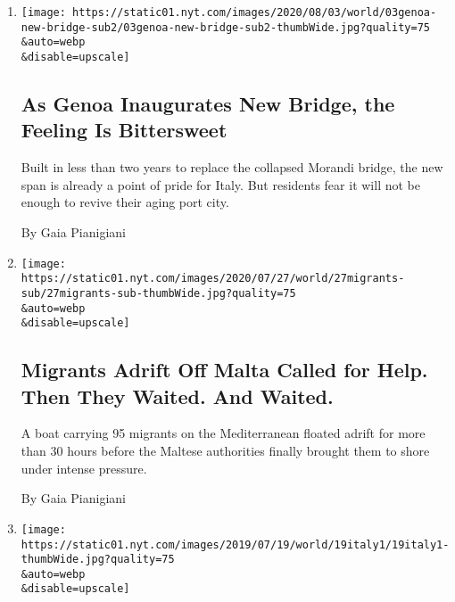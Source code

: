 \begin{enumerate}
\def\labelenumi{\arabic{enumi}.}
\item
  \href{/2020/08/02/world/europe/genoa-Morandi-bridge-replacement.html}{}

  \texttt{[image: https://static01.nyt.com/images/2020/08/03/world/03genoa-new-bridge-sub2/03genoa-new-bridge-sub2-thumbWide.jpg?quality=75\\\&auto=webp\\\&disable=upscale]}

  \hypertarget{as-genoa-inaugurates-new-bridge-the-feeling-is-bittersweet}{%
  \subsection{As Genoa Inaugurates New Bridge, the Feeling Is
  Bittersweet}\label{as-genoa-inaugurates-new-bridge-the-feeling-is-bittersweet}}

  Built in less than two years to replace the collapsed Morandi bridge,
  the new span is already a point of pride for Italy. But residents fear
  it will not be enough to revive their aging port city.

  By Gaia Pianigiani
\item
  \href{/2020/07/27/world/europe/migrant-boat-malta-stranded.html}{}

  \texttt{[image: https://static01.nyt.com/images/2020/07/27/world/27migrants-sub/27migrants-sub-thumbWide.jpg?quality=75\\\&auto=webp\\\&disable=upscale]}

  \hypertarget{migrants-adrift-off-malta-called-for-help-then-they-waited-and-waited}{%
  \subsection{Migrants Adrift Off Malta Called for Help. Then They
  Waited. And
  Waited.}\label{migrants-adrift-off-malta-called-for-help-then-they-waited-and-waited}}

  A boat carrying 95 migrants on the Mediterranean floated adrift for
  more than 30 hours before the Maltese authorities finally brought them
  to shore under intense pressure.

  By Gaia Pianigiani
\item
  \href{/2019/07/19/world/europe/italy-five-star-league.html}{}

  \texttt{[image: https://static01.nyt.com/images/2019/07/19/world/19italy1/19italy1-thumbWide.jpg?quality=75\\\&auto=webp\\\&disable=upscale]}

  \hypertarget{italys-government-parties-are-feuding-but-leaders-agree-to-talk}{%
}
\end{enumerate}
